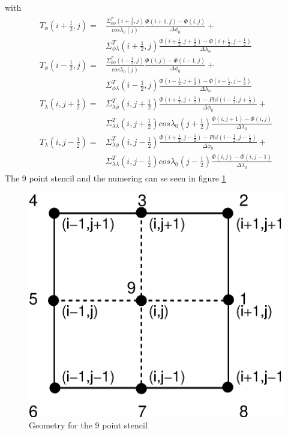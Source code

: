 %
with
%
\begin{align}
\begin{split}
 T_{\phi}(i+\frac{1}{2},j)=&  \frac{\Sigma_{\phi \phi}^T(i+\frac{1}{2},j)}{cos
   \lambda_0(j)} \frac{ \Phi(i+1,j)- \Phi(i,j)}{\Delta \phi_0} + \\
   &\Sigma_{\phi \lambda}^T(i+\frac{1}{2},j) 
   \frac{ \Phi(i+\frac{1}{2},j+\frac{1}{2})-\Phi(i+\frac{1}{2},j-\frac{1}{2})}{\Delta \lambda_0}  \\
 T_{\phi}(i-\frac{1}{2},j)=&  \frac{\Sigma_{\phi \phi}^T(i-\frac{1}{2},j)}{cos
   \lambda_0(j)} \frac{ \Phi(i,j)- \Phi(i-1,j)}{\Delta \phi_0} + \\
   &\Sigma_{\phi \lambda}^T(i-\frac{1}{2},j) 
   \frac{ \Phi(i-\frac{1}{2},j+\frac{1}{2})-\Phi(i-\frac{1}{2},j-\frac{1}{2})}{\Delta \lambda_0}  \\
 T_{\lambda}(i,j+\frac{1}{2})=& \Sigma_{\lambda \phi}^T(i,j+\frac{1}{2})
    \frac{ \Phi(i+\frac{1}{2},j+\frac{1}{2})- Phi(i-\frac{1}{2},j+\frac{1}{2})}{\Delta \phi_0} +\\
   &\Sigma_{\lambda \lambda}^T(i,j+\frac{1}{2}) cos \lambda_0(j+\frac{1}{2}) 
   \frac{ \Phi(i,j+1)-\Phi(i,j)}{\Delta \lambda_0}  \\
 T_{\lambda}(i,j-\frac{1}{2})=& \Sigma_{\lambda \phi}^T(i,j-\frac{1}{2})
    \frac{ \Phi(i+\frac{1}{2},j-\frac{1}{2})- Phi(i-\frac{1}{2},j-\frac{1}{2})}{\Delta \phi_0} +\\ 
   &\Sigma_{\lambda \lambda}^T(i,j-\frac{1}{2}) cos \lambda_0(j-\frac{1}{2}) 
   \frac{ \Phi(i,j)-\Phi(i,j-1)}{\Delta \lambda_0} 
\end{split}
\end{align}
%
The 9 point stencil and the numering can se seen in figure \ref{fig:stencil}
%
\begin{figure}
  \centering
  \includegraphics[scale=0.3]{./tex_plot/stencil.eps}
  \caption{Geometry for the 9 point stencil}
   \label{fig:stencil}
\end{figure}

